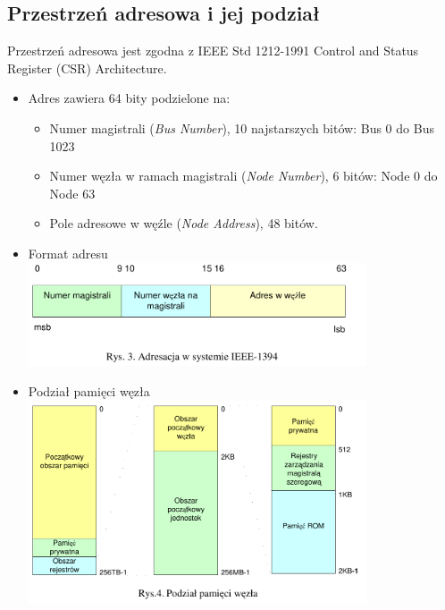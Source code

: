 \subsection{Przestrzeń adresowa i jej podział}
Przestrzeń adresowa jest zgodna z IEEE Std 1212-1991 Control and Status Register (CSR) Architecture.\\
\begin{itemize}
	\item Adres zawiera 64 bity podzielone na:
	\begin{itemize}
		\item Numer magistrali (\emph{Bus Number}), 10 najstarszych bitów: Bus 0 do Bus 1023
		\item Numer węzła w ramach magistrali (\emph{Node Number}), 6 bitów: Node 0 do Node 63
		\item Pole adresowe w węźle (\emph{Node Address}), 48 bitów.
	\end{itemize}
	\item Format adresu\\
	\includegraphics[width=10cm]{./wyklady/FIREWIRE_4_1.pdf}
	\item Podział pamięci węzła\\
	\includegraphics[width=10cm]{./wyklady/FIREWIRE_5_1.pdf}
\end{itemize}


